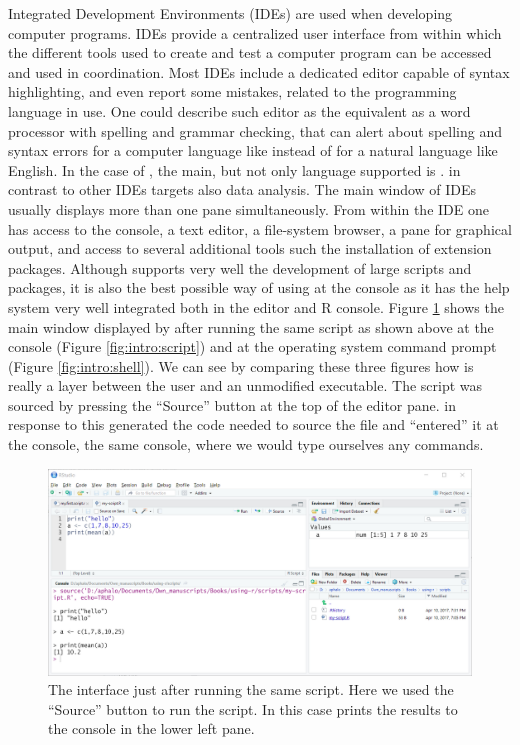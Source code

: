 \documentclass[krantz2]{krantz}\usepackage{knitr}%
\begin{document}
Integrated Development Environments (IDEs) are used when developing computer programs. IDEs provide a centralized user interface from within which the different tools used to create and test a computer program can be accessed and used in coordination. Most IDEs include a dedicated editor capable of syntax highlighting, and even report some mistakes, related to the programming language in use. One could describe such editor as the equivalent as a word processor with spelling and grammar checking, that can alert about spelling and syntax errors for a computer language like \Rlang instead of for a natural language like English. In the case of \RStudio, the main, but not only language supported is \Rlang. \RStudio in contrast to other IDEs targets also data analysis. The main window of IDEs usually displays more than one pane simultaneously. From within the \RStudio IDE one has access to the \Rpgrm console, a text editor, a file-system browser, a pane for graphical output, and access to several additional tools such the installation of extension packages. Although \RStudio supports very well the development of large scripts and packages, it is also the best possible way of using \Rpgrm at the console as it has the \Rpgrm help system very well integrated both in the editor and R console. Figure \ref{fig:intro:rstudio} shows the main window displayed by \RStudio after running the same script as shown above at the \Rpgrm console (Figure \ref{fig:intro:script}) and at the operating system command prompt (Figure \ref{fig:intro:shell}). We can see by comparing these three figures how \RStudio is really a layer between the user and an unmodified \Rpgrm executable. The script was sourced by pressing the ``Source'' button at the top of the editor pane. \RStudio in response to this generated the code needed to source the file and ``entered'' it at the console, the same console, where we would type ourselves any \Rpgrm commands.

\begin{figure}
  \centering
  \includegraphics[width=\linewidth]{figures/Rstudio-script}
  \caption[Script in Rstudio]{The \RStudio interface just after running the same script. Here we used the ``Source'' button to run the script. In this case \Rpgrm prints the results to the \Rpgrm console in the lower left pane.}\label{fig:intro:rstudio}
\end{figure}
\end{document}
